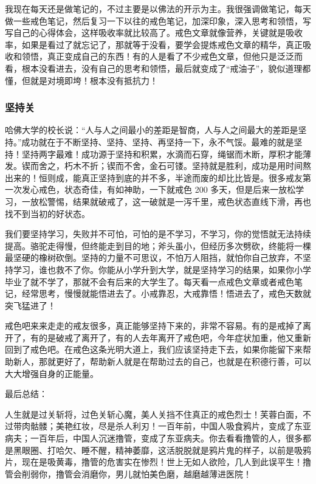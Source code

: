 我现在每天还是做笔记的，不过主要是以佛法的开示为主。我很强调做笔记，每天做一些戒色笔记，然后复习一下以往的戒色笔记，加深印象，深入思考和领悟，写写自己的心得体会，这样吸收率就比较高了。戒色文章就像营养，关键就是吸收率，如果是看过了就忘记了，那就等于没看，要学会提炼戒色文章的精华，真正吸收和领悟，真正变成自己的东西！有的人是看了不少戒色文章，但他只是泛泛而看，根本没看进去，没有自己的思考和领悟，最后就变成了“戒油子”，貌似道理都懂，但就是对境即垮！根本没有抵抗力！

\subsubsection{坚持关}

哈佛大学的校长说：“人与人之间最小的差距是智商，人与人之间最大的差距是坚持。”成功就在于不断坚持、坚持、坚持、再坚持一下，永不气馁。最难的就是坚持！坚持两字最难！成功源于坚持和积累，水滴而石穿，绳锯而木断，厚积才能薄发。锲而舍之，朽木不折；锲而不舍，金石可镂。坚持就是胜利，成功是用时间熬出来的！恒则成，能真正坚持到底的并不多，半途而废的却比比皆是。很多戒友第一次发心戒色，状态奇佳，有如神助，一下就戒色 200 多天，但是后来一放松学习，一放松警惕，结果就破戒了，这一破就是一泻千里，戒色状态直线下滑，再也找不到当初的好状态。

我们要坚持学习，失败并不可怕，可怕的是不学习，不学习，你的觉悟就无法持续提高。骆驼走得慢，但终能走到目的地；斧头虽小，但经历多次劈砍，终能将一棵最坚硬的橡树砍倒。坚持的力量不可思议，不怕万人阻挡，就怕你自己放弃，不坚持学习，谁也救不了你。你能从小学升到大学，就是坚持学习的结果，如果你小学毕业了就不学了，那就不会有后来的大学生了。每天看一点戒色文章或者戒色笔记，经常思考，慢慢就能悟进去了。小戒靠忍，大戒靠悟！悟进去了，戒色天数就突飞猛进了！

戒色吧来来走走的戒友很多，真正能够坚持下来的，非常不容易。有的是戒掉了离开了，有的是破戒了离开了，有的人去年离开了戒色吧，今年症状加重，他又重新回到了戒色吧。在戒色这条光明大道上，我们应该坚持走下去，如果你能留下来帮助新人，那就更好了，帮助新人就是在帮助过去的自己，也就是在积德行善，可以大大增强自身的正能量。

最后总结：

人生就是过关斩将，过色关斩心魔，美人关挡不住真正的戒色烈士！芙蓉白面，不过带肉骷髅；美艳红妆，尽是杀人利刃！一百年前，中国人吸食鸦片，变成了东亚病夫；一百年后，中国人沉迷撸管，变成了东亚病夫。你去看看撸管的人，很多都是黑眼圈、打哈欠、睡不醒，精神萎靡，这活脱脱就是鸦片鬼的样子，以前是吸鸦片，现在是吸黄毒，撸管的危害实在惨烈！世上无如人欲险，几人到此误平生！撸管会削弱你，撸管会消磨你，男儿就怕美色磨，越磨越薄进医院！

